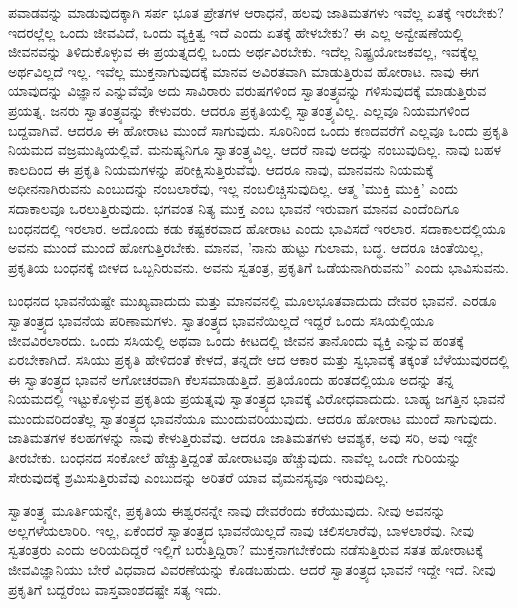 ಪವಾಡವನ್ನು ಮಾಡುವುದಕ್ಕಾಗಿ ಸರ್ಪ ಭೂತ ಪ್ರೇತಗಳ ಆರಾಧನೆ, ಹಲವು ಜಾತಿಮತಗಳು ಇವೆಲ್ಲ ಏತಕ್ಕೆ ಇರಬೇಕು? ಇದರಲ್ಲೆಲ್ಲ ಒಂದು ಜೀವವಿದೆ, ಒಂದು ವ್ಯಕ್ತಿತ್ವ ಇದೆ ಎಂದು ಏತಕ್ಕೆ ಹೇಳಬೇಕು? ಈ ಎಲ್ಲ ಅನ್ವೇಷಣೆಯಲ್ಲಿ ಜೀವನವನ್ನು ತಿಳಿದುಕೊಳ್ಳುವ ಈ ಪ್ರಯತ್ನದಲ್ಲಿ ಒಂದು ಅರ್ಥವಿರಬೇಕು. ಇದೆಲ್ಲ ನಿಷ್ಪ್ರಯೋಜಕವಲ್ಲ, ಇವಕ್ಕೆಲ್ಲ ಅರ್ಥವಿಲ್ಲದೆ ಇಲ್ಲ. ಇವೆಲ್ಲ ಮುಕ್ತನಾಗುವುದಕ್ಕೆ ಮಾನವ ಅವಿರತವಾಗಿ ಮಾಡುತ್ತಿರುವ ಹೋರಾಟ. ನಾವು ಈಗ ಯಾವುದನ್ನು ವಿಜ್ಞಾನ ಎನ್ನುವೆವೊ ಅದು ಸಾವಿರಾರು ವರುಷಗಳಿಂದ ಸ್ವಾತಂತ್ರ್ಯವನ್ನು ಗಳಿಸುವುದಕ್ಕೆ ಮಾಡುತ್ತಿರುವ ಪ್ರಯತ್ನ. ಜನರು ಸ್ವಾತಂತ್ರ್ಯವನ್ನು ಕೇಳುವರು. ಆದರೂ ಪ್ರಕೃತಿಯಲ್ಲಿ ಸ್ವಾತಂತ್ರ್ಯವಿಲ್ಲ. ಎಲ್ಲವೂ ನಿಯಮಗಳಿಂದ ಬದ್ದವಾಗಿವೆ. ಆದರೂ ಈ ಹೋರಾಟ ಮುಂದೆ ಸಾಗುವುದು. ಸೂರಿನಿಂದ ಒಂದು ಕಣದವರೆಗೆ ಎಲ್ಲವೂ ಒಂದು ಪ್ರಕೃತಿ ನಿಯಮದ ವಜ್ರಮುಷ್ಠಿಯಲ್ಲಿವೆ. ಮನುಷ್ಯನಿಗೂ ಸ್ವಾತಂತ್ರ್ಯವಿಲ್ಲ. ಆದರೆ ನಾವು ಅದನ್ನು ನಂಬುವುದಿಲ್ಲ. ನಾವು ಬಹಳ ಕಾಲದಿಂದ ಈ ಪ್ರಕೃತಿ ನಿಯಮಗಳನ್ನು ಪರೀಕ್ಷಿಸುತ್ತಿರುವೆವು. ಆದರೂ ನಾವು, ಮಾನವನು ನಿಯಮಕ್ಕೆ ಅಧೀನನಾಗಿರುವನು ಎಂಬುದನ್ನು ನಂಬಲಾರೆವು, ಇಲ್ಲ ನಂಬಲಿಚ್ಚಿಸುವುದಿಲ್ಲ. ಆತ್ಮ 'ಮುಕ್ತಿ ಮುಕ್ತಿ' ಎಂದು ಸದಾಕಾಲವೂ ಒರಲುತ್ತಿರುವುದು. ಭಗವಂತ ನಿತ್ಯ ಮುಕ್ತ ಎಂಬ ಭಾವನೆ ಇರುವಾಗ ಮಾನವ ಎಂದೆಂದಿಗೂ ಬಂಧನದಲ್ಲಿ ಇರಲಾರ. ಅದೊಂದು ಕಡು ಕಷ್ಟಕರವಾದ ಹೋರಾಟ ಎಂದು ಭಾವಿಸದೆ ಇರಲಾರ. ಸದಾಕಾಲದಲ್ಲಿಯೂ ಅವನು ಮುಂದೆ ಮುಂದೆ ಹೋಗುತ್ತಿರಬೇಕು. ಮಾನವ, 'ನಾನು ಹುಟ್ಟು ಗುಲಾಮ, ಬದ್ಧ. ಆದರೂ ಚಿಂತೆಯಿಲ್ಲ, ಪ್ರಕೃತಿಯ ಬಂಧನಕ್ಕೆ ಬೀಳದ ಒಬ್ಬನಿರುವನು. ಅವನು ಸ್ವತಂತ್ರ, ಪ್ರಕೃತಿಗೆ ಒಡೆಯನಾಗಿರುವನು'' ಎಂದು ಭಾವಿಸುವನು.

ಬಂಧನದ ಭಾವನೆಯಷ್ಟೇ ಮುಖ್ಯವಾದುದು ಮತ್ತು ಮಾನವನಲ್ಲಿ ಮೂಲಭೂತವಾದುದು ದೇವರ ಭಾವನೆ. ಎರಡೂ ಸ್ವಾತಂತ್ರ್ಯದ ಭಾವನೆಯ ಪರಿಣಾಮಗಳು. ಸ್ವಾತಂತ್ರ್ಯದ ಭಾವನೆಯಿಲ್ಲದೆ ಇದ್ದರೆ ಒಂದು ಸಸಿಯಲ್ಲಿಯೂ ಜೀವವಿರಲಾರದು. ಒಂದು ಸಸಿಯಲ್ಲಿ ಅಥವಾ ಒಂದು ಕೀಟದಲ್ಲಿ ಜೀವನ ತಾನೊಂದು ವ್ಯಕ್ತಿ ಎನ್ನುವ ಹಂತಕ್ಕೆ ಏರಬೇಕಾಗಿದೆ. ಸಸಿಯು ಪ್ರಕೃತಿ ಹೇಳಿದಂತೆ ಕೇಳದೆ, ತನ್ನದೇ ಆದ ಆಕಾರ ಮತ್ತು ಸ್ವಭಾವಕ್ಕೆ ತಕ್ಕಂತೆ ಬೆಳೆಯುವುರದಲ್ಲಿ ಈ ಸ್ವಾತಂತ್ರ್ಯದ ಭಾವನೆ ಅಗೋಚರವಾಗಿ ಕೆಲಸಮಾಡುತ್ತಿದೆ. ಪ್ರತಿಯೊಂದು ಹಂತದಲ್ಲಿಯೂ ಅದನ್ನು ತನ್ನ ನಿಯಮದಲ್ಲಿ ಇಟ್ಟುಕೊಳ್ಳುವ ಪ್ರಕೃತಿಯ ಪ್ರಯತ್ನವು ಸ್ವಾತಂತ್ರ್ಯದ ಭಾವಕ್ಕೆ ವಿರೋಧವಾದುದು. ಬಾಹ್ಯ ಜಗತ್ತಿನ ಭಾವನೆ ಮುಂದುವರಿದಂತೆಲ್ಲ ಸ್ವಾತಂತ್ರ್ಯದ ಭಾವನೆಯೂ ಮುಂದುವರಿಯುವುದು. ಆದರೂ ಹೋರಾಟ ಮುಂದೆ ಸಾಗುವುದು. ಜಾತಿಮತಗಳ ಕಲಹಗಳನ್ನು ನಾವು ಕೇಳುತ್ತಿರುವೆವು. ಆದರೂ ಜಾತಿಮತಗಳು ಆವಶ್ಯಕ, ಅವು ಸರಿ, ಅವು ಇದ್ದೇ ತೀರಬೇಕು. ಬಂಧನದ ಸಂಕೋಲೆ ಹೆಚ್ಚುತ್ತಿದ್ದಂತೆ ಹೋರಾಟವೂ ಹೆಚ್ಚುವುದು. ನಾವೆಲ್ಲ ಒಂದೇ ಗುರಿಯನ್ನು ಸೇರುವುದಕ್ಕೆ ಶ್ರಮಿಸುತ್ತಿರುವೆವು ಎಂಬುದನ್ನು ಅರಿತರೆ ಯಾವ ವೈಮನಸ್ಯವೂ ಇರುವುದಿಲ್ಲ.

ಸ್ವಾತಂತ್ರ್ಯ ಮೂರ್ತಿಯನ್ನೇ, ಪ್ರಕೃತಿಯ ಈಶ್ವರನನ್ನೇ ನಾವು ದೇವರೆಂದು ಕರೆಯುವುದು. ನೀವು ಅವನನ್ನು ಅಲ್ಲಗಳೆಯಲಾರಿರಿ. ಇಲ್ಲ, ಏಕೆಂದರೆ ಸ್ವಾತಂತ್ರ್ಯದ ಭಾವನೆಯಿಲ್ಲದೆ ನಾವು ಚಲಿಸಲಾರೆವು, ಬಾಳಲಾರೆವು. ನೀವು ಸ್ವತಂತ್ರರು ಎಂದು ಅರಿಯದಿದ್ದರೆ ಇಲ್ಲಿಗೆ ಬರುತ್ತಿದ್ದಿರಾ? ಮುಕ್ತನಾಗಬೇಕೆಂದು ನಡೆಸುತ್ತಿರುವ ಸತತ ಹೋರಾಟಕ್ಕೆ ಜೀವವಿಜ್ಞಾನಿಯು ಬೇರೆ ವಿಧವಾದ ವಿವರಣೆಯನ್ನು ಕೊಡಬಹುದು. ಆದರೆ ಸ್ವಾತಂತ್ರ್ಯದ ಭಾವನೆ ಇದ್ದೇ ಇದೆ. ನೀವು ಪ್ರಕೃತಿಗೆ ಬದ್ದರೆಂಬ ವಾಸ್ತವಾಂಶದಷ್ಟೇ ಸತ್ಯ ಇದು.


